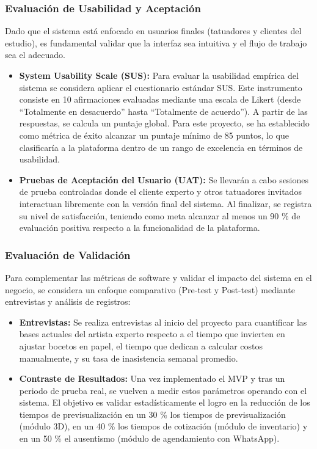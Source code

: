 \subsubsection{Evaluación de Usabilidad y Aceptación}

Dado que el sistema está enfocado en usuarios finales (tatuadores y clientes del estudio), es fundamental validar que la interfaz sea intuitiva y el flujo de trabajo sea el adecuado.
\begin{itemize}
  \item \textbf{System Usability Scale (SUS)\cite{drew2018}:} Para evaluar la usabilidad empírica del sistema se considera aplicar el cuestionario estándar SUS. Este instrumento consiste en 10 afirmaciones evaluadas mediante una escala de Likert (desde ``Totalmente en desacuerdo'' hasta ``Totalmente de acuerdo''). A partir de las respuestas, se calcula un puntaje global. Para este proyecto, se ha establecido como métrica de éxito alcanzar un puntaje mínimo de 85 puntos, lo que clasificaría a la plataforma dentro de un rango de excelencia en términos de usabilidad.

  \item \textbf{Pruebas de Aceptación del Usuario (UAT)\cite{ponce}:} Se llevarán a cabo sesiones de prueba controladas donde el cliente experto y otros tatuadores invitados interactuan libremente con la versión final del sistema. Al finalizar, se registra su nivel de satisfacción, teniendo como meta alcanzar al menos un 90 \% de evaluación positiva respecto a la funcionalidad de la plataforma.
\end{itemize}

\subsubsection{Evaluación de Validación}

Para complementar las métricas de software y validar el impacto del sistema en el negocio, se considera un enfoque comparativo (Pre-test y Post-test) mediante entrevistas y análisis de registros:
\begin{itemize}
  \item \textbf{Entrevistas:} Se realiza entrevistas al inicio del proyecto para cuantificar las bases actuales del artista experto respecto a el tiempo que invierten en ajustar bocetos en papel, el tiempo que dedican a calcular costos manualmente, y su tasa de inasistencia semanal promedio.

  \item \textbf{Contraste de Resultados:} Una vez implementado el MVP y tras un periodo de prueba real, se vuelven a medir estos parámetros operando con el sistema. El objetivo es validar estadísticamente el logro en la reducción de los tiempos de previsualización en un 30 \% los tiempos de previsualización (módulo 3D), en un 40 \% los tiempos de cotización (módulo de inventario) y en un 50 \% el ausentismo (módulo de agendamiento con WhatsApp).
\end{itemize}

